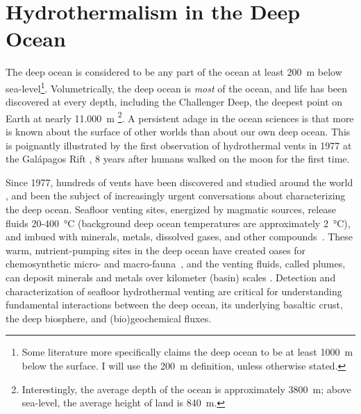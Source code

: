 \section{Hydrothermalism in the Deep Ocean}
\label{sec:charting-plumes}
The deep ocean is considered to be any part of the ocean at least \SI{200}{\meter} below sea-level\footnote{Some literature more specifically claims the deep ocean to be at least \SI{1000}{\meter} below the surface. I will use the \SI{200}{\meter} definition, unless otherwise stated.}.
Volumetrically, the deep ocean is \emph{most} of the ocean, and life has been discovered at every depth, including the Challenger Deep, the deepest point on Earth at nearly \SI{11,000}{\meter} \autocite{cario2019exploring} \footnote{Interestingly, the average depth of the ocean is approximately \SI{3800}{\meter}; above sea-level, the average height of land is \SI{840}{\meter}.}.
A persistent adage in the ocean sciences is that more is known about the surface of other worlds than about our own deep ocean.
This is poignantly illustrated by the first observation of hydrothermal vents in 1977 at the Galápagos Rift \autocite{corliss1979submarine}, 8 years after humans walked on the moon for the first time.

Since 1977, hundreds of vents have been discovered and studied around the world \autocite{beaulieu2013authoritative}, and been the subject of increasingly urgent conversations about characterizing the deep ocean.
Seafloor venting sites, energized by magmatic sources, release fluids 20-\SI{400}{\celsius} (background deep ocean temperatures are approximately \SI{2}{\celsius}), and imbued with minerals, metals, dissolved gases, and other compounds~\autocite{jannasch1985geomicrobiology, martin2008hydrothermal}.
These warm, nutrient-pumping sites in the deep ocean have created oases for chemosynthetic micro- and macro-fauna~\autocite{corliss1979submarine}, and the venting fluids, called plumes, can deposit minerals and metals over kilometer (basin) scales \autocite{scholz2019shelf,resing2015basin,le2019hydrothermal}.
Detection and characterization of seafloor hydrothermal venting are critical for understanding fundamental interactions between the deep ocean, its underlying basaltic crust, the deep biosphere, and (bio)geochemical fluxes.

